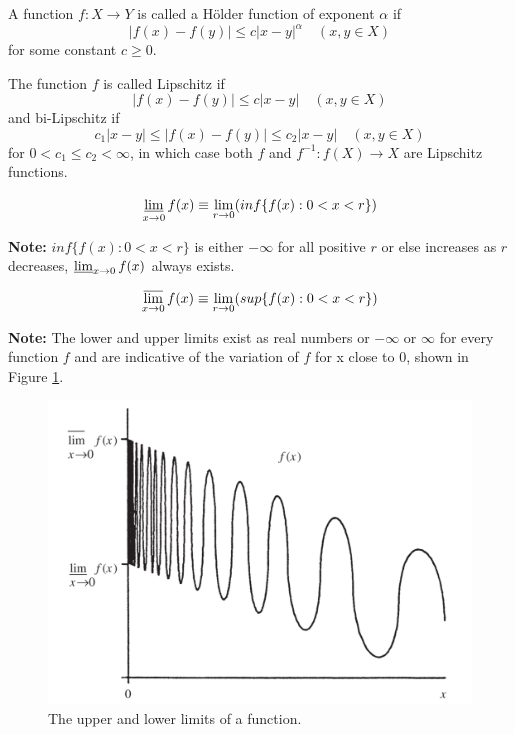 \begin{definition}
    A function $f: X \rightarrow Y$ is called a Hölder function of exponent $\alpha$ if
$$
|f(x)-f(y)| \leq c|x-y|^{\alpha} \quad(x, y \in X)
$$
    for some constant $c\geq 0$.
\end{definition}

\begin{definition}
    The function $f$ is called Lipschitz if
    $$
    |f(x)-f(y)| \leq c|x-y| \quad(x, y \in X)
    $$
    and bi-Lipschitz if 
    $$
    c_{1}|x-y| \leq |f(x)-f(y)| \leq c_{2}|x-y| \quad(x, y \in X)
    $$
    for $0<c_{1} \leq c_{2}<\infty$, in which case both $f$ and 
    $f^{-1}: f(X) \rightarrow X$ are Lipschitz functions.     
\end{definition}

\begin{definition}
    $$\displaystyle \operatorname*{\underline{lim}}_{x \to 0} f(x) \equiv \lim_{r\to 0}(inf\{f(x):0<x<r\})$$
\end{definition}

\textbf{Note:} $inf\{f(x):0<x<r\}$ is either $-\infty$ for all positive $r$ or else increases as $r$ decreases, 
$\operatorname*{\underline{lim}}_{x \to 0} f(x)$ always exists.

\begin{definition}
    $$\displaystyle \operatorname*{\overline{lim}}_{x \to 0} f(x) \equiv  \lim_{r\to 0}(sup\{f(x):0<x<r\})$$
\end{definition}

\textbf{Note:} The lower and upper limits exist as real numbers or $-\infty$ or $\infty$ for 
every function $f$ and are indicative of the variation of $f$ for x close to 0, shown in Figure \ref{fig:lowerupperlimit}.

\begin{figure}[H]
    \centering
    \includegraphics[width=.66\textwidth]{images/limit1.png}
    \caption{The upper and lower limits of a function.}
    \label{fig:lowerupperlimit}
\end{figure}

